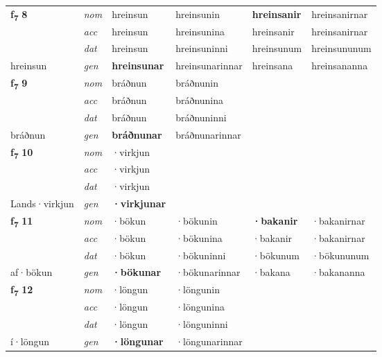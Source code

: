 \begin{longtable}[l]{X>{\footnotesize\itshape}XXXXX}
\multirow{3}{*}{{{\textbf{f{\textsubscript{7}}} \Large{\textbf{8}}}}} & nom & hreinsun & hreinsunin & \textbf{hreinsanir} & hreinsanirnar \\*
 & acc & hreinsun & hreinsunina & hreinsanir & hreinsanirnar \\*
 & dat & hreinsun & hreinsuninni & hreinsunum & hreinsununum \\*
 {\footnotesize{hreinsun}} & gen & \textbf{hreinsunar} & hreinsunarinnar & hreinsana & hreinsananna \\
\midrule

\multirow{3}{*}{{{\textbf{f{\textsubscript{7}}} \Large{\textbf{9}}}}} & nom & bráðnun & bráðnunin & \textbf{} &  \\*
 & acc & bráðnun & bráðnunina &  &  \\*
 & dat & bráðnun & bráðnuninni &  &  \\*
 {\footnotesize{bráðnun}} & gen & \textbf{bráðnunar} & bráðnunarinnar &  &  \\
\midrule

\multirow{3}{*}{{{\textbf{f{\textsubscript{7}}} \Large{\textbf{10}}}}} & nom & ·virkjun &  & \textbf{} &  \\*
 & acc & ·virkjun &  &  &  \\*
 & dat & ·virkjun &  &  &  \\*
 {\footnotesize{Lands\allowbreak ·virkjun}} & gen & \textbf{·virkjunar} &  &  &  \\
\midrule

\multirow{3}{*}{{{\textbf{f{\textsubscript{7}}} \Large{\textbf{11}}}}} & nom & ·bökun & ·bökunin & \textbf{·bakanir} & ·bakanirnar \\*
 & acc & ·bökun & ·bökunina & ·bakanir & ·bakanirnar \\*
 & dat & ·bökun & ·bökuninni & ·bökunum & ·bökununum \\*
 {\footnotesize{af\allowbreak ·bökun}} & gen & \textbf{·bökunar} & ·bökunarinnar & ·bakana & ·bakananna \\
\midrule

\multirow{3}{*}{{{\textbf{f{\textsubscript{7}}} \Large{\textbf{12}}}}} & nom & ·löngun & ·löngunin & \textbf{} &  \\*
 & acc & ·löngun & ·löngunina &  &  \\*
 & dat & ·löngun & ·lönguninni &  &  \\*
 {\footnotesize{í\allowbreak ·löngun}} & gen & \textbf{·löngunar} & ·löngunarinnar &  &  \\
\midrule


\end{longtable}
